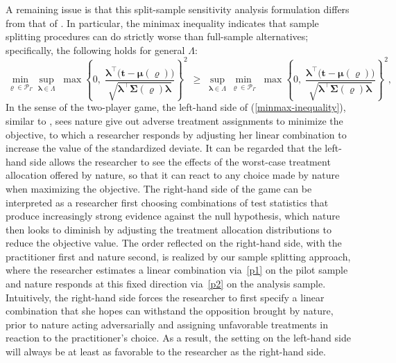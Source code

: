 \documentclass[12pt,leqno,titlepage]{amsart}
\newcommand{\1}{\mathbbm{1}}
\begin{document}
\begin{bibunit}
A remaining issue is that this split-sample sensitivity analysis formulation differs from that of \cite{cohen2020multivariate}. In particular, the minimax inequality %
indicates that sample splitting procedures can do strictly worse than full-sample alternatives; specifically, the following holds for general $\Lambda$:
\begin{equation} \label{minmax-inequality}
\min_{\boldsymbol{\varrho} \in \mathcal{P}_{\Gamma}} 
\sup_{\boldsymbol{\lambda} \in \Lambda} \;
\max
\left \{
0,\;
\frac{\boldsymbol{\lambda}^\top\bigl(\mathbf{t} - \boldsymbol{\mu}(\boldsymbol{\varrho})\bigr) }
{ \sqrt{\boldsymbol{\lambda}^\top \boldsymbol{
\Sigma}(\boldsymbol{\varrho})\boldsymbol{\lambda}} }
\right \}^2
\;\geq \;
\sup_{\boldsymbol{\lambda} \in \Lambda} 
\min_{\boldsymbol{\varrho} \in \mathcal{P}_{\Gamma}} \;
\max
\left \{
0,\;
\frac{\boldsymbol{\lambda}^\top\bigl(\mathbf{t} - \boldsymbol{\mu}(\boldsymbol{\varrho})\bigr) }
{ \sqrt{\boldsymbol{\lambda}^\top \boldsymbol{
\Sigma}(\boldsymbol{\varrho})\boldsymbol{\lambda}} }
\right \}^2,
\end{equation}
In the sense of the two-player game, the left-hand side of (\ref{minmax-inequality}), similar to \cite{cohen2020multivariate}, sees nature give out adverse treatment assignments to minimize the objective, to which a researcher responds by adjusting her linear combination to increase the value of the standardized deviate. 
It can be regarded that the left-hand side allows the researcher to see the effects of the worst-case treatment allocation offered by nature, so that it can react to any choice made by nature when maximizing the objective.
The right-hand side of the game can be interpreted as a researcher first choosing combinations of test statistics that produce increasingly strong evidence against the null hypothesis, which nature then looks to diminish by adjusting the treatment allocation distributions to reduce the objective value. 
The order reflected on the right-hand side, with the practitioner first and nature second, is realized by our sample splitting approach, where the researcher estimates a linear combination via~\eqref{p1} on the pilot sample and nature responds at this fixed direction via~\eqref{p2} on the analysis sample. 
Intuitively, the right-hand side forces the researcher to first specify a linear combination that she hopes can withstand the opposition brought by nature, prior to nature acting adversarially and assigning unfavorable treatments in reaction to the practitioner's choice. As a result, the setting on the left-hand side will always be at least as favorable to the researcher as the right-hand side.


\end{bibunit}
\end{document}
